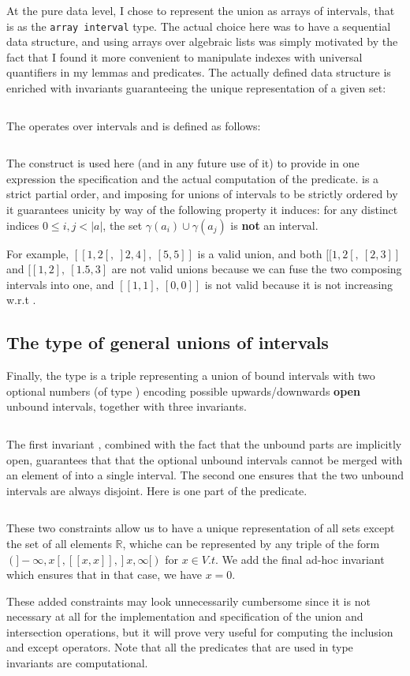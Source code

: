 At the pure data level, I chose to represent the union as arrays of intervals, that
is as the \texttt{array interval} type.
%
The actual choice here was to have a sequential data structure, and using
arrays over algebraic lists was simply motivated by the fact that I found it more
convenient to manipulate indexes with universal quantifiers in my lemmas and predicates.
%
The actually defined data structure is enriched with invariants guaranteeing the
unique representation of a given set:
%
\inputminted{\whyml}{why3code/bound_union_type.mlw}
The \minline{(<<)} operates over intervals and is defined as follows:
%
\inputminted{\whyml}{why3code/before_interval_pred.mlw}
%
The  construct is used here (and in any future use of it) to provide in
one expression the specification and the actual computation of the predicate.
%
\minline{(<<)} is a strict partial order, and imposing for unions of intervals to be
strictly ordered by it guarantees unicity by way of the following property it
induces: for any distinct indices $0 \le i, j < |a|$, the set
$\gamma(a_i) \cup \gamma(a_j)$ is \textbf{not} an interval.

For example, $[[1, 2[,~]2, 4],~[5, 5]]$ is a valid union, and both
$[[1, 2[,~[2, 3]]$ and $[[1, 2],~[1.5, 3]$ are not valid unions because we
can fuse the two composing intervals into one, and $[[1, 1],~[0,0]]$ is not valid
because it is not increasing w.r.t \minline{(<<)}.

\subsection{The type of general unions of intervals}
Finally, the type  is a triple representing a union of bound intervals
with two optional numbers (of type ) encoding possible
upwards/downwards \textbf{open} unbound intervals, together with three invariants.
%
\inputminted{\whyml}{why3code/u_type.mlw}
%
The first invariant , combined with the fact that the
unbound parts are implicitly open, guarantees that that the optional unbound
intervals cannot be merged with an element of  into a single interval.
The second one  ensures that the two unbound intervals
are always disjoint. Here is one part of the  predicate.
%
\inputminted{\whyml}{why3code/bound_unbound_disj_pred.mlw}
%
These two constraints allow us to have a unique representation of all sets except the
set of all elements $\mathbb{R}$, whiche can be represented by any triple of the
form $(]-\infty, x[, [[x,x]], ]x, \infty[)$ for $x\in V.t$.
%
We add the final ad-hoc invariant  which ensures that in
that case, we have $x = 0$.

These added constraints may look unnecessarily cumbersome since it is not necessary at
all for the implementation and specification of the union and intersection
operations, but it will prove very useful for computing the inclusion and except
operators.
%
Note that all the predicates that are used in type invariants are
computational.
